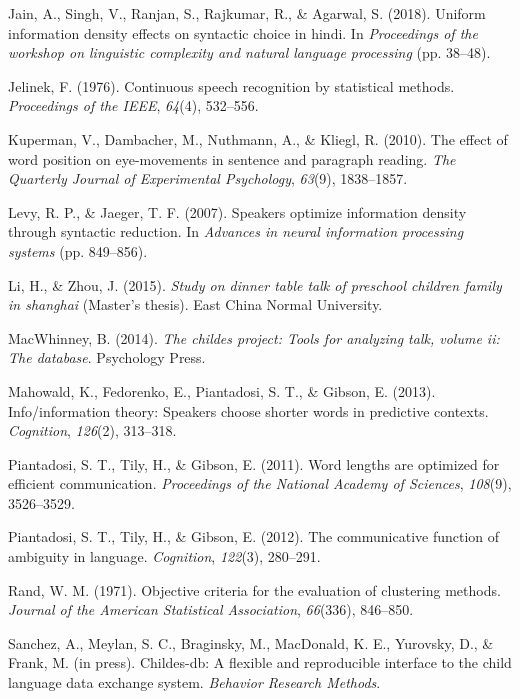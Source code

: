 \documentclass[10pt, letterpaper]{article}
\begin{document}
\leavevmode\hypertarget{ref-jain2018}{}%
Jain, A., Singh, V., Ranjan, S., Rajkumar, R., \& Agarwal, S. (2018).
Uniform information density effects on syntactic choice in hindi. In
\emph{Proceedings of the workshop on linguistic complexity and natural
language processing} (pp. 38--48).

\leavevmode\hypertarget{ref-jelinek1976}{}%
Jelinek, F. (1976). Continuous speech recognition by statistical
methods. \emph{Proceedings of the IEEE}, \emph{64}(4), 532--556.

\leavevmode\hypertarget{ref-kuperman2010}{}%
Kuperman, V., Dambacher, M., Nuthmann, A., \& Kliegl, R. (2010). The
effect of word position on eye-movements in sentence and paragraph
reading. \emph{The Quarterly Journal of Experimental Psychology},
\emph{63}(9), 1838--1857.

\leavevmode\hypertarget{ref-levy2007}{}%
Levy, R. P., \& Jaeger, T. F. (2007). Speakers optimize information
density through syntactic reduction. In \emph{Advances in neural
information processing systems} (pp. 849--856).

\leavevmode\hypertarget{ref-li2015}{}%
Li, H., \& Zhou, J. (2015). \emph{Study on dinner table talk of
preschool children family in shanghai} (Master's thesis). East China
Normal University.

\leavevmode\hypertarget{ref-macwhinney2014}{}%
MacWhinney, B. (2014). \emph{The childes project: Tools for analyzing
talk, volume ii: The database}. Psychology Press.

\leavevmode\hypertarget{ref-mahowald2013}{}%
Mahowald, K., Fedorenko, E., Piantadosi, S. T., \& Gibson, E. (2013).
Info/information theory: Speakers choose shorter words in predictive
contexts. \emph{Cognition}, \emph{126}(2), 313--318.

\leavevmode\hypertarget{ref-piantadosi2011}{}%
Piantadosi, S. T., Tily, H., \& Gibson, E. (2011). Word lengths are
optimized for efficient communication. \emph{Proceedings of the National
Academy of Sciences}, \emph{108}(9), 3526--3529.

\leavevmode\hypertarget{ref-piantadosi2012}{}%
Piantadosi, S. T., Tily, H., \& Gibson, E. (2012). The communicative
function of ambiguity in language. \emph{Cognition}, \emph{122}(3),
280--291.

\leavevmode\hypertarget{ref-rand1971}{}%
Rand, W. M. (1971). Objective criteria for the evaluation of clustering
methods. \emph{Journal of the American Statistical Association},
\emph{66}(336), 846--850.

\leavevmode\hypertarget{ref-sanchez2019}{}%
Sanchez, A., Meylan, S. C., Braginsky, M., MacDonald, K. E., Yurovsky,
D., \& Frank, M. (in press). Childes-db: A flexible and reproducible
interface to the child language data exchange system. \emph{Behavior
Research Methods}.
\end{document}
